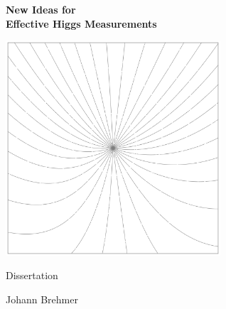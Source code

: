 \documentclass[a4paper,
	oneside,
        openright,
	cleardoublepage=plain,
	11pt,
        DIV=16]{scrreprt}
\newcommand{\tptitle}[1]{{\Huge \bfseries \color{white} #1}}
\newcommand{\tpauthor}[1]{{\LARGE \color{white} #1}}
\begin{document}

\begin{titlepage}
  \pagestyle{empty}
  \pagecolor{dark-bordeaux}
  \begin{center}

    \vspace*{4cm}

    \tptitle{New Ideas for \\[0.5cm] Effective Higgs Measurements}

    \vspace*{3.5cm}

    \includegraphics[width=0.6\textwidth]{cover_image.png}

    \vspace*{2cm}

    \tpauthor{Dissertation}

    \vspace*{0.5cm}

    \tpauthor{Johann Brehmer}

  \end{center}
\end{titlepage}
\end{document}
